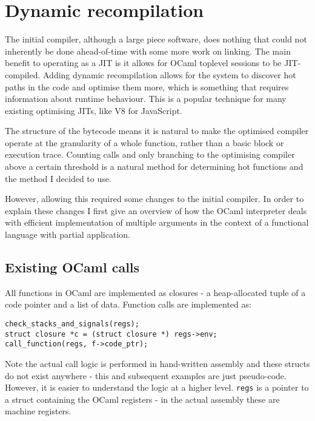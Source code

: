 \section{Dynamic recompilation} \label{dyn-recomp}

The initial compiler, although a large piece software, does nothing that could not inherently be
done ahead-of-time with some more work on linking. The main benefit to operating as a JIT is it
allows for OCaml toplevel sessions to be JIT-compiled. Adding dynamic recompilation allows for the
system to discover hot paths in the code and optimise them more, which is something that requires
information about runtime behaviour. This is a popular technique for many existing optimising JITs,
like V8 for JavaScript.

The structure of the bytecode means it is natural to make the optimised compiler operate at the
granularity of a whole function, rather than a basic block or execution trace. Counting calls and
only branching to the optimising compiler above a certain threshold is a natural method for
determining hot functions and the method I decided to use.

However, allowing this required some changes to the initial compiler. In order to explain these
changes I first give an overview of how the OCaml interpreter deals with efficient
implementation of multiple arguments in the context of a functional language with partial
application.

\subsection{Existing OCaml calls} \label{exist-ocaml}

All functions in OCaml are implemented as closures - a heap-allocated tuple of a code pointer and a
list of data. Function calls are implemented as:

\begin{verbatim}
check_stacks_and_signals(regs);
struct closure *c = (struct closure *) regs->env;
call_function(regs, f->code_ptr);
\end{verbatim}

Note the actual call logic is performed in hand-written assembly and these structs do not exist
anywhere
- this and subsequent examples are just pseudo-code. However, it is easier to understand the logic
at a higher level. \texttt{regs} is a pointer to a struct containing the OCaml registers - in the
actual assembly these are machine registers.

